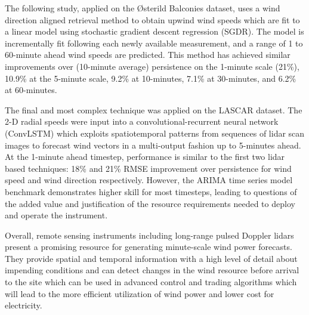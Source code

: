 The following study, applied on the {\O}sterild Balconies dataset, uses a wind direction aligned retrieval method to obtain upwind wind speeds which are fit to a linear model using stochastic gradient descent regression (SGDR). The model is incrementally fit following each newly available measurement, and a range of 1 to 60-minute ahead wind speeds are predicted. This method has achieved similar improvements over (10-minute average) persistence on the 1-minute scale (21\%), 10.9\% at the 5-minute scale, 9.2\% at 10-minutes, 7.1\% at 30-minutes, and 6.2\% at 60-minutes. 

The final and most complex technique was applied on the LASCAR dataset. The 2-D radial speeds were input into a convolutional-recurrent neural network (ConvLSTM) which exploits spatiotemporal patterns from sequences of lidar scan images to forecast wind vectors in a multi-output fashion up to 5-minutes ahead. At the 1-minute ahead timestep, performance is similar to the first two lidar based techniques: 18\% and 21\% RMSE improvement over persistence for wind speed and wind direction respectively. However, the ARIMA time series model benchmark demonstrates higher skill for most timesteps, leading to questions of the added value and justification of the resource requirements needed to deploy and operate the instrument.

Overall, remote sensing instruments including long-range pulsed Doppler lidars present a promising resource for generating minute-scale wind power forecasts. They provide spatial and temporal information with a high level of detail about impending conditions and can detect changes in the wind resource before arrival to the site which can be used in advanced control and trading algorithms which will lead to the more efficient utilization of wind power and lower cost for electricity.


\begin{comment}
The time horizon of forecast models on these scales must be doable within this, to give automated or advisory...
-----------------------------------------------------
ts modeling vs lidar
\end{comment}

